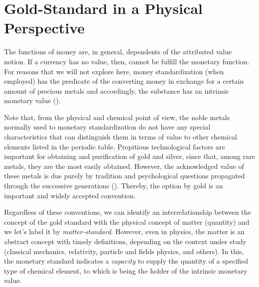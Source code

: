 \documentclass[11pt]{article}
\begin{document}
\section{Gold-Standard in a Physical Perspective} \label{matter_standard}

The functions of money are, in general, dependents of the attributed value notion. If a currency has no value, then, cannot be fulfill the 
monetary function. For reasons that we will not explore here, money standardization (when employed) has the predicate of the converting 
money in exchange for a certain amount of precious metals and accordingly, the substance has an intrinsic monetary 
value (\citealt{GOLDSTANDART}).

Note that, from the physical and chemical point of view, the noble metals normally used to monetary standardization do not have any special 
characteristics that can distinguish them in terms of value to other chemical elements listed in the periodic table. Propitious 
technological factors are important for obtaining and purification of gold and silver, since that, among rare metals, they are the most 
easily obtained. However, the acknowledged value of these metals is due purely by tradition and psychological questions propagated through 
the successive generations (\citealt{PSYCHOLOGY}). Thereby, the option by gold is an important and widely accepted convention.

Regardless of these conventions, we can identify an interrelationship between the concept of the gold standard with the physical concept of 
matter (quantity) and we let's label it by \emph{matter-standard}. However, even in physics, the matter is an abstract concept with timely 
definitions, depending on the context under study (classical mechanics, relativity, particle and fields physics, and others). In this, the 
monetary standard indicates a \emph{capacity} to supply the quantity of a specified type of chemical element, to which is being the holder 
of the intrinsic monetary value.
\end{document}
